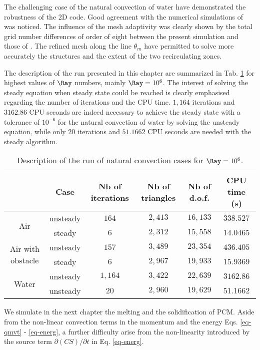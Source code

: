 \noindent The challenging case of the natural convection of water have demonstrated the robustness of the 2D code. 
Good agreement with the numerical simulations of \cite{Kowalewski-2003} was noticed. 
The influence of the mesh adaptivity was clearly shown by the total grid number differences of order of eight between the present simulation and those of \cite{Kowalewski-2003} .
The refined mesh along the line $\theta_m$ have permitted to solve more accurately the structures and the extent of the two recirculating zones.

The description of the run presented in this chapter are summarized in Tab. \ref{tab-natconv-cases} for highest values of $\Ray$ numbers, mainly $\Ray = 10^6$.
The interest of solving the steady equation when steady state could be reached is clearly emphasised regarding the number of iterations and the CPU time.
$1,164$ iterations and $3162.86$ CPU seconds are indeed necessary to achieve the steady state with a tolerance of $10^{-6}$ for the natural convection of water by solving the unsteady equation,
while only $20$ iterations and $51.1662$ CPU seconds are needed with the steady algorithm.

\begin{table}[!h]
\centering
\begin{tabular}{*{6}{c}}
  & Case & {\small Nb of iterations} & {\small Nb of triangles} & {\small Nb of d.o.f.} & {\small CPU time (s)}   \\
  \toprule 
  \multirow{2}{*}{Air} & unsteady & $164$ & $2,413$ & $16,133$ & $338.527$ \\
   & steady & $6$ & $2,312$ & $15,558$ & $14.0465$ \\
  \hline
  \multirow{2}{*}{Air with obstacle} & unsteady & $157$ & $3,489$ & $23,354$ & $436.405$ \\
  & steady & $6$ & $2,967$ & $19,933$ & $15.9369$ \\
  \hline
  \multirow{2}{*}{Water} & unsteady & $1,164$ & $3,422$ & $22,639$ & $3162.86$ \\
   & unsteady & $20$ & $2,960$ & $19,629$ & $51.1662$ \\

\bottomrule
 \end{tabular}
\caption{Description of the run of natural convection cases for $\Ray = 10^6$.}
\label{tab-natconv-cases}
\end{table}

We simulate in the next chapter the melting and the solidification of PCM.
Aside from the non-linear convection terms in the momentum and the energy Eqs. \ref{eq-qmvt} - \ref{eq-energ}, a further difficulty arise from the non-linearity introduced by the source term $\partial (CS)/\partial t$ in Eq. \ref{eq-energ}.
